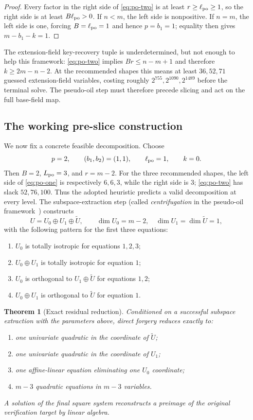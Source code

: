 \documentclass[10pt,a4paper]{article}
\newtheorem{theorem}{Theorem}[section]
\begin{document}
\begin{proof}
Every factor in the right side of \eqref{eq:po-two} is at least $r\ge\ell_{\rm po}\ge1$, so the right side is at least $B\ell_{\rm po}>0$.  If $n<m$, the left side is nonpositive.  If $n=m$, the left side is one, forcing $B=\ell_{\rm po}=1$ and hence $p=b_1=1$; equality then gives $m-b_1-k=1$.
\end{proof}

The extension-field key-recovery tuple is underdetermined, but not enough to help this framework: \eqref{eq:po-two} implies $Br\le n-m+1$ and therefore $k\ge2m-n-2$.  At the recommended shapes this means at least $36,52,71$ guessed extension-field variables, costing roughly $2^{755},2^{1090},2^{1489}$ before the terminal solve.  The pseudo-oil step must therefore precede slicing and act on the full base-field map.

\subsection{The working pre-slice construction}

We now fix a concrete feasible decomposition. Choose
\[
p=2,
\qquad
(b_1,b_2)=(1,1),
\qquad
\ell_{\rm po}=1,
\qquad
k=0.
\]
Then $B=2$, $L_{\rm po}=3$, and $r=m-2$.  For the three recommended shapes, the left side of \eqref{eq:po-one} is respectively $6,6,3$, while the right side is $3$; \eqref{eq:po-two} has slack $52,76,100$.  Thus the adopted heuristic predicts a valid decomposition at every level.  The subspace-extraction step (called \emph{centrifugation} in the pseudo-oil framework~\cite{JustGuess,Ostuzzi}) constructs
\[
U=U_0\oplus U_1\oplus\widetilde U,
\qquad
\dim U_0=m-2,
\quad
\dim U_1=\dim\widetilde U=1,
\]
with the following pattern for the first three equations:
\begin{enumerate}[label=(\alph*)]
\item $U_0$ is totally isotropic for equations $1,2,3$;
\item $U_0\oplus U_1$ is totally isotropic for equation $1$;
\item $U_0$ is orthogonal to $U_1\oplus\widetilde U$ for equations $1,2$;
\item $U_0\oplus U_1$ is orthogonal to $\widetilde U$ for equation $1$.
\end{enumerate}

\begin{theorem}[Exact residual reduction]\label{thm:po-reduction}
Conditioned on a successful subspace extraction with the parameters above, direct forgery reduces exactly to:
\begin{enumerate}
\item one univariate quadratic in the coordinate of $\widetilde U$;
\item one univariate quadratic in the coordinate of $U_1$;
\item one affine-linear equation eliminating one $U_0$ coordinate;
\item $m-3$ quadratic equations in $m-3$ variables.
\end{enumerate}
A solution of the final square system reconstructs a preimage of the original verification target by linear algebra.
\end{theorem}
\end{document}

